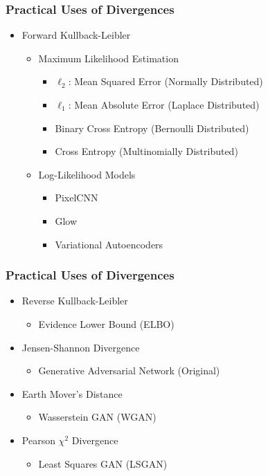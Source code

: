 \documentclass{beamer}
\begin{document}
\begin{frame}
  \frametitle{Practical Uses of Divergences}
  \begin{itemize}
    \item Forward Kullback-Leibler
    \begin{itemize}
      \item Maximum Likelihood Estimation
      \begin{itemize}
        \item $\ell_2$: Mean Squared Error (Normally Distributed)
        \item $\ell_1$: Mean Absolute Error (Laplace Distributed)
        \item Binary Cross Entropy (Bernoulli Distributed)
        \item Cross Entropy (Multinomially Distributed)
      \end{itemize}
      \item Log-Likelihood Models
      \begin{itemize}
        \item PixelCNN
        \item Glow
        \item Variational Autoencoders
      \end{itemize}
    \end{itemize}
  \end{itemize}
\end{frame}


\begin{frame}
  \frametitle{Practical Uses of Divergences}
  \begin{itemize}
    \item Reverse Kullback-Leibler
      \begin{itemize}
        \item Evidence Lower Bound (ELBO)
      \end{itemize}
    \item Jensen-Shannon Divergence
      \begin{itemize}
        \item Generative Adversarial Network (Original)
      \end{itemize}
    \item Earth Mover's Distance
      \begin{itemize}
        \item Wasserstein GAN (WGAN)
      \end{itemize}
    \item Pearson $\chi^2$ Divergence
      \begin{itemize}
        \item Least Squares GAN (LSGAN)
      \end{itemize}
  \end{itemize}
\end{frame}
\end{document}
